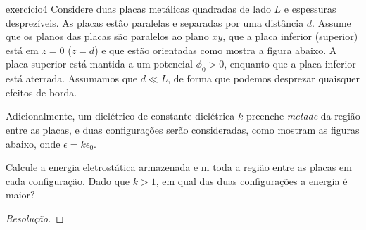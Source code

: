 \begin{exercício}{}{exercício4}
    Considere duas placas metálicas quadradas de lado \(L\) e espessuras desprezíveis. As placas estão paralelas e separadas por uma distância \(d\). Assume que os planos das placas são paralelos ao plano \(xy\), que a placa inferior (superior) está em \(z = 0\) (\(z = d\)) e que estão orientadas como mostra a figura abaixo. A placa superior está mantida a um potencial \(\phi_0>0\), enquanto que a placa inferior está aterrada. Assumamos que \(d \ll L\), de forma que podemos desprezar quaisquer efeitos de borda.

    Adicionalmente, um dielétrico de constante dielétrica \(k\) preenche \emph{metade} da região entre as placas, e duas configurações serão consideradas, como mostram as figuras abaixo, onde \(\epsilon = k \epsilon_0\).

    Calcule a energia eletrostática armazenada e m toda a região entre as placas em cada configuração. Dado que \(k > 1\), em qual das duas configurações a energia é maior?
\end{exercício}
\begin{proof}[Resolução]

\end{proof}
